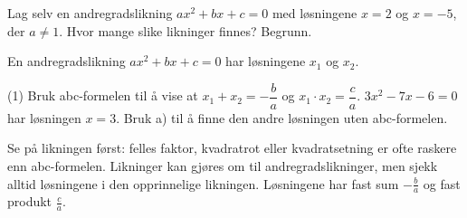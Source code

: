 Lag selv en andregradslikning $ax^2 + bx + c = 0$ med løsningene $x = 2$ og $x = -5$, der $a \neq 1$.
Hvor mange slike likninger finnes? Begrunn.

En andregradslikning $ax^2 + bx + c = 0$ har løsningene $x_1$ og $x_2$.
\begin{tasks}(1)
  \task Bruk abc-formelen til å vise at $x_1 + x_2 = -\dfrac{b}{a}$ og $x_1 \cdot x_2 = \dfrac{c}{a}$.
  \task $3x^2 - 7x - 6 = 0$ har løsningen $x = 3$. Bruk a) til å finne den andre løsningen uten abc-formelen.
\end{tasks}

\begin{oppsummering}
Se på likningen først: felles faktor, kvadratrot eller kvadratsetning er ofte raskere enn abc-formelen.
Likninger kan gjøres om til andregradslikninger, men sjekk alltid løsningene i den opprinnelige likningen.
Løsningene har fast sum $-\frac{b}{a}$ og fast produkt $\frac{c}{a}$.
\end{oppsummering}
